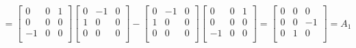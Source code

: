 \documentclass[../main.tex]{subfiles}
\begin{document}
 \begin{align*}
 [A_2,A_3] = \begin{bmatrix}
     0&0&1\\    
     0&0&0\\
     -1&0&0\\    
  \end{bmatrix}
  \begin{bmatrix}
     0&-1&0\\    
     1&0&0\\
     0&0&0\\    
 \end{bmatrix} -
 \begin{bmatrix}
     0&-1&0\\    
     1&0&0\\
     0&0&0\\    
 \end{bmatrix} \begin{bmatrix}
     0&0&1\\    
     0&0&0\\
     -1&0&0\\    
 \end{bmatrix}= \begin{bmatrix}
     0&0&0\\    
     0&0&-1\\
     0&1&0\\    
 \end{bmatrix}
 =A_1
 \end{align*}
\end{document}
